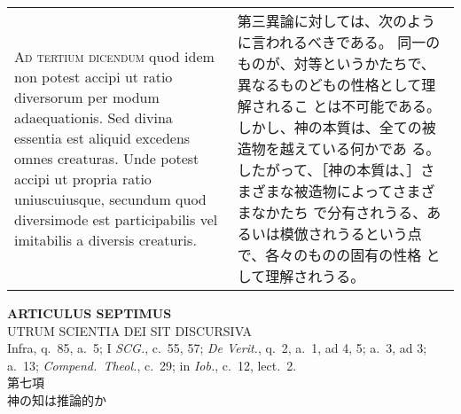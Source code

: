 \documentclass[10pt]{jsarticle} %
\begin{document}
\begin{longtable}{p{21em}p{21em}}
\\


{\scshape Ad tertium dicendum} quod idem non potest
accipi ut ratio diversorum per modum adaequationis. Sed divina essentia
est aliquid excedens omnes creaturas. Unde potest accipi ut propria
ratio uniuscuiusque, secundum quod diversimode est participabilis vel
imitabilis a diversis creaturis.

&

第三異論に対しては、次のように言われるべきである。
同一のものが、対等というかたちで、異なるものどもの性格として理解されるこ
 とは不可能である。しかし、神の本質は、全ての被造物を越えている何かであ
 る。したがって、［神の本質は、］さまざまな被造物によってさまざまなかたち
 で分有されうる、あるいは模倣されうるという点で、各々のものの固有の性格
 として理解されうる。

\\

\end{longtable}
\newpage





\begin{center}
 {\Large {\bf ARTICULUS SEPTIMUS}}\\
 {\large UTRUM SCIENTIA DEI SIT DISCURSIVA}\\
 {\footnotesize Infra, q.~85, a.~5; I {\itshape SCG.}, c.~55, 57;
 {\itshape De Verit.}, q.~2, a.~1, ad 4, 5; a.~3, ad 3; a.~13; {\itshape
 Compend.~Theol.}, c.~29; in {\itshape Iob.}, c.~12, lect.~2.}\\
 {\Large 第七項\\神の知は推論的か}
\end{center}
\end{document}
